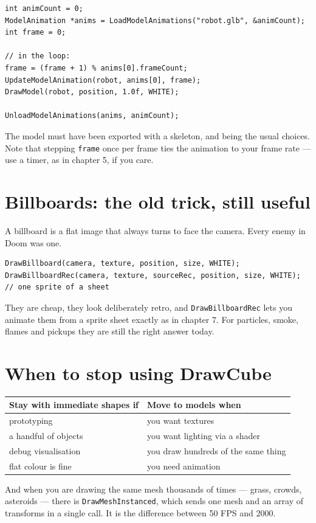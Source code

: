 \begin{lstlisting}
int animCount = 0;
ModelAnimation *anims = LoadModelAnimations("robot.glb", &animCount);
int frame = 0;

// in the loop:
frame = (frame + 1) % anims[0].frameCount;
UpdateModelAnimation(robot, anims[0], frame);
DrawModel(robot, position, 1.0f, WHITE);

UnloadModelAnimations(anims, animCount);
\end{lstlisting}

The model must have been exported with a skeleton,  and 
being the usual choices. Note that stepping \lstinline|frame| once per frame ties
the animation to your frame rate --- use a timer, as in chapter 5, if you care.

\section{Billboards: the old trick, still useful}

A billboard is a flat image that always turns to face the camera. Every enemy in
Doom was one.

\begin{lstlisting}
DrawBillboard(camera, texture, position, size, WHITE);
DrawBillboardRec(camera, texture, sourceRec, position, size, WHITE);  // one sprite of a sheet
\end{lstlisting}

They are cheap, they look deliberately retro, and \lstinline|DrawBillboardRec|
lets you animate them from a sprite sheet exactly as in chapter 7. For particles,
smoke, flames and pickups they are still the right answer today.

\section{When to stop using DrawCube}

\begin{center}
\begin{tabular}{@{}ll@{}}
\toprule
\textbf{Stay with immediate shapes if} & \textbf{Move to models when} \\
\midrule
prototyping & you want textures \\
a handful of objects & you want lighting via a shader \\
debug visualisation & you draw hundreds of the same thing \\
flat colour is fine & you need animation \\
\bottomrule
\end{tabular}
\end{center}

And when you are drawing the same mesh thousands of times --- grass, crowds,
asteroids --- there is \lstinline|DrawMeshInstanced|, which sends one mesh and an
array of transforms in a single call. It is the difference between 50 FPS and
2000.

